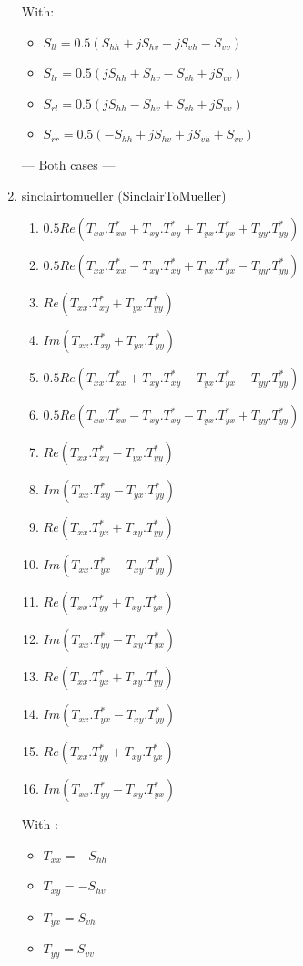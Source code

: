 \begin{enumerate}
With:
\begin{itemize} 
\item $ S_{ll} = 0.5(S_{hh}+j S_{hv}+j S_{vh}-S_{vv}) $ 
\item $ S_{lr} = 0.5(j S_{hh}+S_{hv}-S_{vh}+j S_{vv}) $ 
\item $ S_{rl} = 0.5(j S_{hh}-S_{hv}+ S_{vh}+j S_{vv}) $ 
\item $ S_{rr} = 0.5(-S_{hh}+j S_{hv}+j S_{vh}+S_{vv}) $ 
\end{itemize}
 


--- Both cases ---

\item sinclairtomueller (SinclairToMueller)
\begin{enumerate} 
\item $ 0.5 Re( T_{xx}.T_{xx}^{*} + T_{xy}.T_{xy}^{*} + T_{yx}.T_{yx}^{*} + T_{yy}.T_{yy}^{*} ) $ 
\item $ 0.5 Re( T_{xx}.T_{xx}^{*} - T_{xy}.T_{xy}^{*} + T_{yx}.T_{yx}^{*} - T_{yy}.T_{yy}^{*} ) $ 
\item $ Re( T_{xx}.T_{xy}^{*} + T_{yx}.T_{yy}^{*} ) $ 
\item $ Im( T_{xx}.T_{xy}^{*} + T_{yx}.T_{yy}^{*} ) $ 
\item $ 0.5 Re( T_{xx}.T_{xx}^{*} + T_{xy}.T_{xy}^{*} - T_{yx}.T_{yx}^{*} - T_{yy}.T_{yy}^{*} ) $ 
\item $ 0.5 Re( T_{xx}.T_{xx}^{*} - T_{xy}.T_{xy}^{*} - T_{yx}.T_{yx}^{*} + T_{yy}.T_{yy}^{*} ) $ 
\item $ Re( T_{xx}.T_{xy}^{*} - T_{yx}.T_{yy}^{*} ) $ 
\item $ Im( T_{xx}.T_{xy}^{*} - T_{yx}.T_{yy}^{*} ) $ 
\item $ Re( T_{xx}.T_{yx}^{*} + T_{xy}.T_{yy}^{*} ) $ 
\item $ Im( T_{xx}.T_{yx}^{*} - T_{xy}.T_{yy}^{*} ) $ 
\item $ Re( T_{xx}.T_{yy}^{*} + T_{xy}.T_{yx}^{*} ) $ 
\item $ Im( T_{xx}.T_{yy}^{*} - T_{xy}.T_{yx}^{*} ) $ 
\item $ Re( T_{xx}.T_{yx}^{*} + T_{xy}.T_{yy}^{*} ) $ 
\item $ Im( T_{xx}.T_{yx}^{*} - T_{xy}.T_{yy}^{*} ) $ 
\item $ Re( T_{xx}.T_{yy}^{*} + T_{xy}.T_{yx}^{*} ) $ 
\item $ Im( T_{xx}.T_{yy}^{*} - T_{xy}.T_{yx}^{*} ) $
\end{enumerate}

With :
\begin{itemize}
\item $ T_{xx} = -S_{hh} $ 
\item $ T_{xy} = -S_{hv} $ 
\item $ T_{yx} = S_{vh} $ 
\item $ T_{yy} = S_{vv} $ 
\end{itemize}


\end{enumerate}
